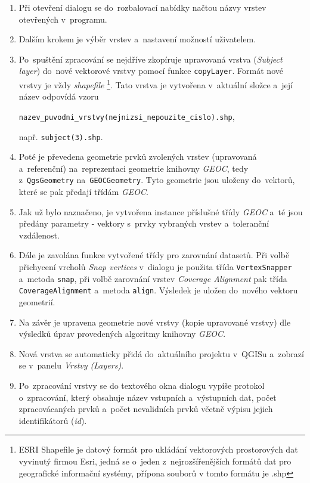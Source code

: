 \begin{enumerate}
 \item Při otevření dialogu se do~rozbalovací nabídky načtou názvy vrstev 
	otevřených v~programu.
 \item Dalším krokem je výběr vrstev a~nastavení možností uživatelem.
 \item Po~spuštění zpracování se nejdříve zkopíruje upravovaná vrstva 
	(\textit{Subject layer}) do~nové vektorové vrstvy pomocí funkce 
	\texttt{copyLayer}. Formát nové vrstvy je vždy \textit{shapefile}
	\footnote{ESRI Shapefile je datový formát pro ukládání vektorových 
	  prostorových dat  vyvinutý firmou Esri, jedná se o~jeden 
	  z~nejrozšířenějších formátů dat pro geografické informační systémy,
	  přípona souborů v tomto formátu je .shp}.
	Tato vrstva je vytvořena v~aktuální složce a~její název odpovídá vzoru 
	\begin{center}
	 \texttt{nazev\_puvodni\_vrstvy(nejnizsi\_nepouzite\_cislo).shp},
	\end{center}
	např. \texttt{subject(3).shp}.
 \item Poté je převedena geometrie prvků zvolených vrstev (upravovaná
	a~referenční) na~reprezentaci geometrie knihovny \textit{GEOC},
	tedy z~\texttt{Qgs\-Geo\-metry} na~\texttt{GEOC\-Geo\-metry}. 
	Tyto geometrie 	jsou uloženy do~vektorů, které se pak předají 
	třídám \textit{GEOC}.
 \item Jak už bylo naznačeno, je vytvořena instance příslušné třídy 
	\textit{GEOC} a~té jsou předány parametry - vektory s~prvky vybraných
	vrstev a~toleranční vzdálenost. 
 \item Dále je zavolána funkce vytvořené třídy pro zarovnání datasetů. Při volbě 
	při\-chycení vrcholů \textit{Snap vertices} v~dialogu je použita třída 
	\texttt{VertexSnapper} a~metoda \texttt{snap}, při volbě zarovnání 
	vrstev \textit{Coverage Alignment} pak třída \texttt{Cove\-rage\-Align\-ment} 
	a~metoda \texttt{align}. Výsledek je uložen do~nového vektoru geometrií.
 \item Na závěr je upravena geometrie nové vrstvy (kopie upravované vrstvy) dle
	výsledků úprav provedených algoritmy knihovny \textit{GEOC}.
 \item Nová vrstva se automaticky přidá do~aktuálního projektu v~QGISu a~zobrazí
	se v~panelu \textit{Vrstvy (Layers)}.
 \item Po~zpracování vrstvy se do textového okna dialogu vypíše protokol 
	o~zpracování, který obsahuje název vstupních a~výstupních dat, počet
	zpracovácaných prvků a~počet nevalidních prvků včetně výpisu jejich
	identifikátorů (\textit{id}).
\end{enumerate}


